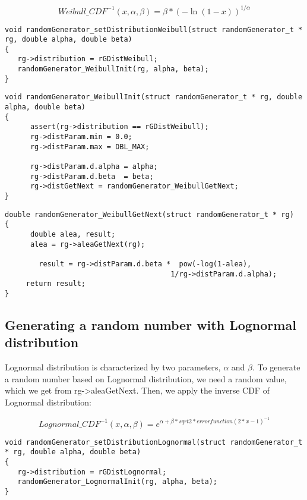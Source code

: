   $$Weibull\_CDF^{-1}(x,\alpha,\beta)=\beta*(-\ln(1-x))^{1/\alpha}$$

\begin{verbatim}
void randomGenerator_setDistributionWeibull(struct randomGenerator_t * rg, double alpha, double beta)
{
   rg->distribution = rGDistWeibull;
   randomGenerator_WeibullInit(rg, alpha, beta);
}
\end{verbatim}


\begin{verbatim}
void randomGenerator_WeibullInit(struct randomGenerator_t * rg, double alpha, double beta)
{
      assert(rg->distribution == rGDistWeibull);   
      rg->distParam.min = 0.0;
      rg->distParam.max = DBL_MAX;
  
      rg->distParam.d.alpha = alpha;
      rg->distParam.d.beta  = beta; 
      rg->distGetNext = randomGenerator_WeibullGetNext;
}
\end{verbatim}

\begin{verbatim}
double randomGenerator_WeibullGetNext(struct randomGenerator_t * rg)
{
      double alea, result;
      alea = rg->aleaGetNext(rg);

        result = rg->distParam.d.beta *  pow(-log(1-alea), 
                                       1/rg->distParam.d.alpha);
     return result;
}
\end{verbatim}

\subsection{Generating a random number with Lognormal distribution}


Lognormal distribution is characterized by two parameters, $\alpha$ and $\beta$.
To generate a random number based on Lognormal distribution, we need a random value, which we get from rg->aleaGetNext. Then, we apply the inverse CDF of Lognormal distribution:

   $$ Lognormal\_CDF^{-1}(x,\alpha,\beta) = e^{\alpha + \beta * sqrt{2} * errorfunction(2*x-1)^{-1}} $$

\begin{verbatim}
void randomGenerator_setDistributionLognormal(struct randomGenerator_t * rg, double alpha, double beta)
{
   rg->distribution = rGDistLognormal;
   randomGenerator_LognormalInit(rg, alpha, beta);
} 
\end{verbatim}

